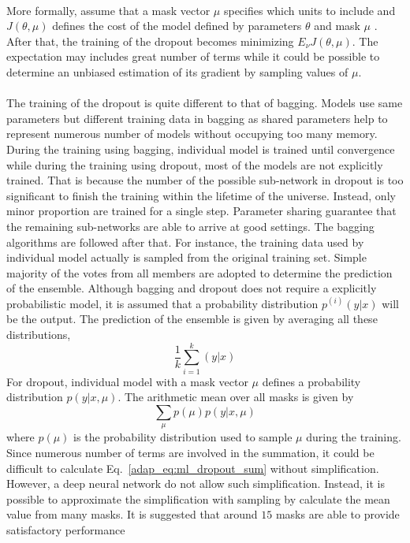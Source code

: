 \paragraph{}
More formally, assume that a mask vector $\mu$ specifies which units to include and $J(\theta,\mu)$ defines the cost of the model defined by parameters $\theta$ and mask $\mu$ \cite{Goodfellow-et-al-2016}.
After that, the training of the dropout becomes minimizing $E_\nu J(\theta,\mu)$.
The expectation may includes great number of terms while it could be possible to determine an unbiased estimation of its gradient by sampling values of $\mu$.

\paragraph{}
The training of the dropout is quite different to that of bagging.
Models use same parameters but different training data in bagging as shared parameters help to represent numerous number of models without occupying too many memory.
During the training using bagging, individual model is trained until convergence while during the training using dropout, most of the models are not explicitly trained.
That is because the number of the possible sub-network in dropout is too significant to finish the training within the lifetime of the universe.
Instead, only minor proportion are trained for a single step.
Parameter sharing guarantee that the remaining sub-networks are able to arrive at good settings.
The bagging algorithms are followed after that.
For instance, the training data used by individual model actually is sampled from the original training set.
Simple majority of the votes from all members are adopted to determine the prediction of the ensemble.
Although bagging and dropout does not require a explicitly probabilistic model, it is assumed that a probability distribution $p^{(i)}(y|x)$ will be the output.
The prediction of the ensemble is given by averaging all these distributions,
\begin{equation}
    \frac{1}{k} \sum_{i=1}^k (y|x)
\end{equation}
%
For dropout, individual model with a mask vector $\mu$ defines a probability distribution $p(y|x, \mu)$.
The arithmetic mean over all masks is given by
\begin{equation}
    \sum_\mu p(\mu) p(y|x, \mu)
    \label{adap_eq:ml_dropout_sum}
\end{equation}
%
where $p(\mu)$ is the probability distribution used to sample $\mu$ during the training.
Since numerous number of terms are involved in the summation, it could be difficult to calculate Eq.~\ref{adap_eq:ml_dropout_sum} without simplification.
However, a deep neural network do not allow such simplification.
Instead, it is possible to approximate the simplification with sampling by calculate the mean value from many masks.
It is suggested that around $15$ masks are able to provide satisfactory performance \cite{Goodfellow-et-al-2016}

